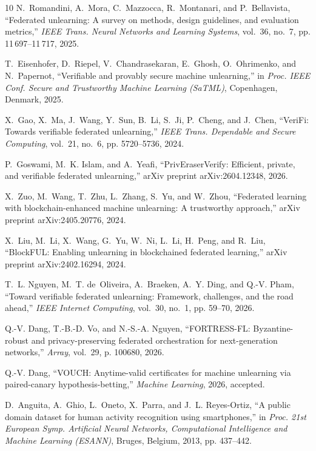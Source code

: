 \documentclass[journal]{IEEEtran}
\begin{document}
\begin{thebibliography}{10}
N.~Romandini, A.~Mora, C.~Mazzocca, R.~Montanari, and P.~Bellavista,
  ``Federated unlearning: A survey on methods, design guidelines, and
  evaluation metrics,'' \emph{IEEE Trans. Neural Networks and Learning
  Systems}, vol.~36, no.~7, pp. 11\,697--11\,717, 2025.

T.~Eisenhofer, D.~Riepel, V.~Chandrasekaran, E.~Ghosh, O.~Ohrimenko, and
  N.~Papernot, ``Verifiable and provably secure machine unlearning,'' in
  \emph{Proc. IEEE Conf. Secure and Trustworthy Machine Learning (SaTML)},
  Copenhagen, Denmark, 2025.

X.~Gao, X.~Ma, J.~Wang, Y.~Sun, B.~Li, S.~Ji, P.~Cheng, and J.~Chen,
  ``{VeriFi}: Towards verifiable federated unlearning,'' \emph{IEEE Trans.
  Dependable and Secure Computing}, vol.~21, no.~6, pp. 5720--5736, 2024.

P.~Goswami, M.~K. Islam, and A.~Yeafi, ``{PrivEraserVerify}: Efficient,
  private, and verifiable federated unlearning,'' arXiv preprint
  arXiv:2604.12348, 2026.

X.~Zuo, M.~Wang, T.~Zhu, L.~Zhang, S.~Yu, and W.~Zhou, ``Federated learning
  with blockchain-enhanced machine unlearning: A trustworthy approach,'' arXiv
  preprint arXiv:2405.20776, 2024.

X.~Liu, M.~Li, X.~Wang, G.~Yu, W.~Ni, L.~Li, H.~Peng, and R.~Liu, ``{BlockFUL}:
  Enabling unlearning in blockchained federated learning,'' arXiv preprint
  arXiv:2402.16294, 2024.

T.~L. Nguyen, M.~T. de~Oliveira, A.~Braeken, A.~Y. Ding, and Q.-V. Pham,
  ``Toward verifiable federated unlearning: Framework, challenges, and the road
  ahead,'' \emph{IEEE Internet Computing}, vol.~30, no.~1, pp. 59--70, 2026.

Q.-V. Dang, T.-B.-D. Vo, and N.-S.-A. Nguyen, ``{FORTRESS-FL}: Byzantine-robust
  and privacy-preserving federated orchestration for next-generation
  networks,'' \emph{Array}, vol.~29, p. 100680, 2026.

Q.-V. Dang, ``{VOUCH}: Anytime-valid certificates for machine unlearning via
  paired-canary hypothesis-betting,'' \emph{Machine Learning}, 2026, accepted.

D.~Anguita, A.~Ghio, L.~Oneto, X.~Parra, and J.~L. Reyes-Ortiz, ``A public
  domain dataset for human activity recognition using smartphones,'' in
  \emph{Proc. 21st European Symp. Artificial Neural Networks, Computational
  Intelligence and Machine Learning (ESANN)}, Bruges, Belgium, 2013, pp.
  437--442.


\end{thebibliography}
\end{document}
